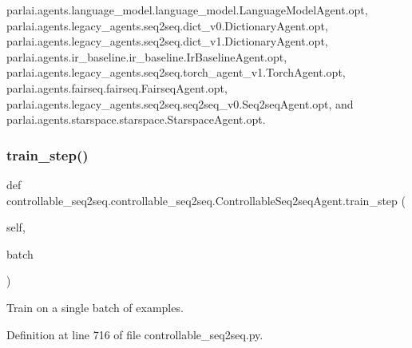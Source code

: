 parlai.\+agents.\+language\+\_\+model.\+language\+\_\+model.\+Language\+Model\+Agent.\+opt, parlai.\+agents.\+legacy\+\_\+agents.\+seq2seq.\+dict\+\_\+v0.\+Dictionary\+Agent.\+opt, parlai.\+agents.\+legacy\+\_\+agents.\+seq2seq.\+dict\+\_\+v1.\+Dictionary\+Agent.\+opt, parlai.\+agents.\+ir\+\_\+baseline.\+ir\+\_\+baseline.\+Ir\+Baseline\+Agent.\+opt, parlai.\+agents.\+legacy\+\_\+agents.\+seq2seq.\+torch\+\_\+agent\+\_\+v1.\+Torch\+Agent.\+opt, parlai.\+agents.\+fairseq.\+fairseq.\+Fairseq\+Agent.\+opt, parlai.\+agents.\+legacy\+\_\+agents.\+seq2seq.\+seq2seq\+\_\+v0.\+Seq2seq\+Agent.\+opt, and parlai.\+agents.\+starspace.\+starspace.\+Starspace\+Agent.\+opt.

\mbox{\label{classcontrollable__seq2seq_1_1controllable__seq2seq_1_1ControllableSeq2seqAgent_a88e4d25c8f2eccaf1c7595d40c4f607b}} 
\subsubsection{\texorpdfstring{train\+\_\+step()}{train\_step()}}
{\footnotesize\ttfamily def controllable\+\_\+seq2seq.\+controllable\+\_\+seq2seq.\+Controllable\+Seq2seq\+Agent.\+train\+\_\+step (\begin{DoxyParamCaption}\item[{}]{self,  }\item[{}]{batch }\end{DoxyParamCaption})}

\begin{DoxyVerb}Train on a single batch of examples.\end{DoxyVerb}
 

Definition at line 716 of file controllable\+\_\+seq2seq.\+py.




